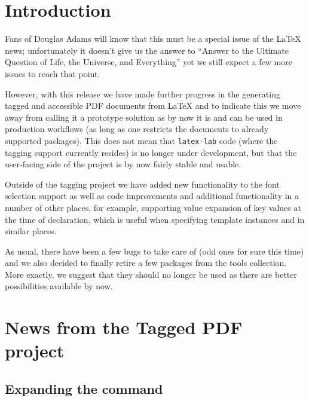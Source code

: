 \documentclass{ltnews}
\providecommand\Dash {\unskip \textemdash}
\begin{document}
\maketitle
{  \spaceskip=3.33pt 
\tableofcontents}

\setlength{}

\medskip

\section{Introduction}

Fans of Douglas Adams will know that this must be a special issue of the
\LaTeX{} news; unfortunately it doesn't give us the answer to
\enquote{Answer to the Ultimate Question of Life, the Universe, and
  Everything} yet \Dash we still expect a few more issues to reach that
point.

However, with this release we have made further progress in the
generating tagged and accessible PDF documents from \LaTeX{} and to
indicate this we move away from calling it a prototype solution as by
now it is and can be used in production workflows (as long as one
restricts the documents to already supported packages). This does not
mean that \texttt{latex-lab} code (where the tagging support currently
resides) is no longer under development, but that the user-facing side
of the project is by now fairly stable and usable.

Outside of the tagging project we have added new functionality to the
font selection support as well as code improvements and additional
functionality in a number of other places, for example, supporting
value expansion of key values at the time of declaration, which is
useful when specifying template instances and in similar places.

As usual, there have been a few bugs to take care of (odd ones for
sure this time) and we also decided to finally retire a few packages
from the tools collection. More exactly, we suggest that they should no
longer be used as there are better possibilities available by now.


\section{News from the Tagged PDF project}

\subsection{Expanding the  command}
\end{document}
